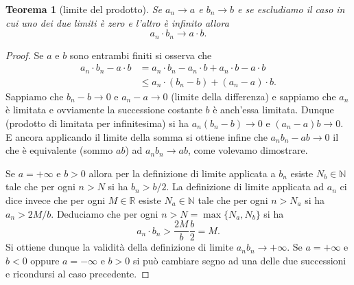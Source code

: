 \documentclass[italian,a4paper,oneside,headinclude]{scrbook}
\newcommand{\NN}{\mathbb N}
\newcommand{\RR}{\mathbb R}
\newtheorem{theorem}{Teorema}
\begin{document}
\begin{theorem}[limite del prodotto]
Se $a_n \to a$ e $b_n \to b$
e se escludiamo il caso in cui uno dei due limiti
è zero e l'altro è infinito
allora
\[
  a_n \cdot b_n \to a\cdot b.
\]
\end{theorem}
\begin{proof}
Se $a$ e $b$ sono entrambi finiti si osserva che
\begin{align*}
  a_n \cdot b_n - a\cdot b
  &= a_n \cdot b_n - a_n \cdot b + a_n \cdot b - a\cdot b\\
  &\le a_n \cdot(b_n - b) + (a_n -a) \cdot b.
\end{align*}
Sappiamo che $b_n - b \to 0$ e $a_n - a \to 0$ (limite della differenza)
e sappiamo che $a_n$ è limitata e ovviamente la successione costante $b$ è anch'essa limitata.
Dunque (prodotto di limitata per infinitesima) si ha $a_n(b_n-b)\to 0$ e $(a_n-a)b\to 0$. E ancora applicando il limite della somma si ottiene
infine che $a_n b_n - ab\to 0$ il che è equivalente (sommo $ab$) ad $a_n b_n\to ab$, come volevamo dimostrare.

Se $a = +\infty$ e $b>0$ allora per la definizione di limite applicata a $b_n$
esiste $N_b\in \NN$ tale che per ogni $n>N$ si ha $b_n > b/2$. La definizione
di limite applicata ad $a_n$ ci dice invece che per ogni $M\in \RR$
esiste $N_a\in \NN$ tale che per ogni $n>N_a$ si ha $a_n > 2M/b$.
Deduciamo che per ogni $n> N=\max\{N_a, N_b\}$ si ha
\[
  a_n\cdot b_n > \frac{2M}{b}\frac{b}{2} = M.
\]
Si ottiene dunque la validità della definizione di limite $a_n b_n\to +\infty$.
Se $a= +\infty$ e $b<0$ oppure $a=-\infty$ e $b>0$ si può cambiare segno
ad una delle due successioni e ricondursi al caso precedente.
\end{proof}
\end{document}
